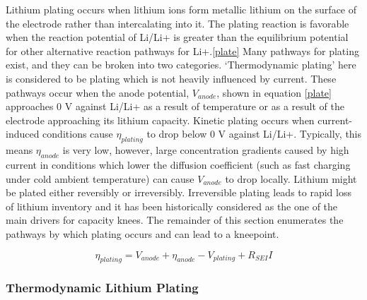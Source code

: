 \documentclass{article}
\begin{document}
Lithium plating occurs when lithium ions form metallic lithium on the surface of the electrode rather than intercalating into it. The plating reaction is favorable when the reaction potential of Li/Li+ is greater than the equilibrium potential for other alternative reaction pathways for Li+.\ref{plate} Many pathways for plating exist, and they can be broken into two categories. `Thermodynamic plating' here is considered to be plating which is not heavily influenced by current. These pathways occur when the anode potential, $V_{anode}$, shown in equation \ref{plate} approaches 0 V against Li/Li+ as a result of temperature\cite{wang_underpotential_2020} or as a result of the electrode approaching its lithium capacity. Kinetic plating occurs when current-induced conditions cause $\eta_{plating}$ to drop below 0 V against Li/Li+. Typically, this means $\eta_{anode}$ is very low, however, large concentration gradients caused by high current in conditions which lower the diffusion coefficient (such as fast charging under cold ambient temperature) can cause $V_{anode}$ to drop locally. Lithium might be plated either reversibly or irreversibly. Irreversible plating leads to rapid loss of lithium inventory and it has been historically considered as the one of the main drivers for capacity knees. The remainder of this section enumerates the pathways by which plating occurs and can lead to a kneepoint.

\begin{equation}
    \eta_{plating} = V_{anode}+\eta_{anode}-V_{plating}+R_{SEI}I
    \label{plate}
\end{equation}


\subsubsection{Thermodynamic Lithium Plating}

\end{document}
